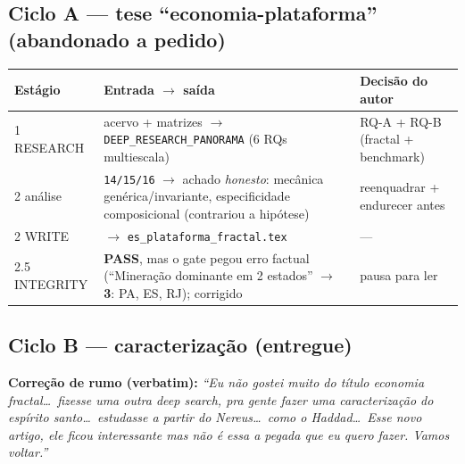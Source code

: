 \documentclass[12pt,a4paper]{article}
\begin{document}
\subsection{Ciclo A — tese ``economia-plataforma'' (abandonado a pedido)}
\begin{longtable}{p{2.6cm}p{8.3cm}p{3.4cm}}
\toprule
\textbf{Estágio} & \textbf{Entrada $\to$ saída} & \textbf{Decisão do autor} \\
\midrule
1 RESEARCH & acervo + matrizes $\to$ \texttt{DEEP\_RESEARCH\_PANORAMA} (6 RQs multiescala) & RQ-A + RQ-B (fractal + benchmark) \\
2 análise & \texttt{14/15/16} $\to$ achado \emph{honesto}: mecânica genérica/invariante, especificidade composicional (contrariou a hipótese) & reenquadrar + endurecer antes \\
2 WRITE & $\to$ \texttt{es\_plataforma\_fractal.tex} & — \\
2.5 INTEGRITY & \textbf{PASS}, mas o gate pegou erro factual (``Mineração dominante em 2 estados'' $\to$ \textbf{3}: PA, ES, RJ); corrigido & pausa para ler \\
\bottomrule
\end{longtable}

\subsection{Ciclo B — caracterização (entregue)}
\noindent\textbf{Correção de rumo (verbatim):} \emph{``Eu não gostei muito do título economia fractal\dots\
fizesse uma outra deep search, pra gente fazer uma caracterização do espírito santo\dots\ estudasse a
partir do Nereus\dots\ como o Haddad\dots\ Esse novo artigo, ele ficou interessante mas não é essa a
pegada que eu quero fazer. Vamos voltar.''}
\end{document}
